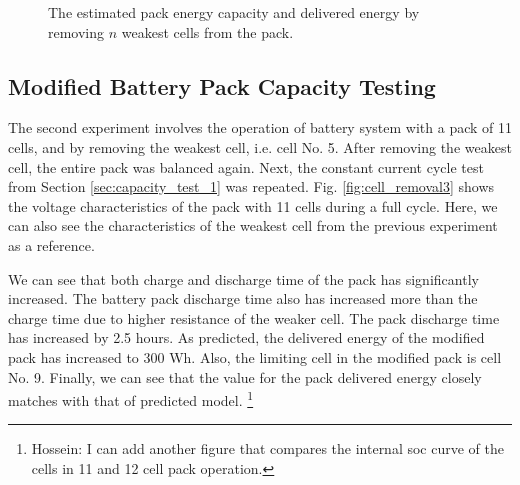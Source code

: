 \documentclass[10pt,twocolumn]{IEEEtran}
\begin{document}
  
\begin{figure}
\centering
\vspace{-0.2cm}
{} \vspace{-0.1cm}
\caption{The estimated pack energy capacity and delivered energy by removing $n$ weakest cells from the pack. }
\vspace{-0.3cm}
\label{fig:cell_removal2}
\end{figure} 


\subsection{Modified  Battery Pack Capacity Testing}
The second  experiment involves the operation of battery system with a pack of 11 cells, and by removing the weakest cell, i.e. cell No. 5. 
After removing the weakest cell, the entire pack was balanced again. Next, the constant current cycle test from Section \ref{sec:capacity_test_1}  was repeated.
Fig.  \ref{fig:cell_removal3} shows the voltage characteristics of the pack with 11 cells during a full cycle.
Here, we can also see the characteristics of the weakest cell from the previous experiment as a reference.

We can see that both charge and discharge time of the pack has significantly increased. 
The battery pack discharge time also has increased more than the charge time due to higher resistance of the weaker cell.
The pack discharge time has increased by 2.5 hours.
As predicted,  the delivered energy of the modified pack has increased to 300 Wh.
Also,  the limiting cell in the modified pack is cell No. 9. 
Finally, we can see that the value for the pack delivered energy closely matches with that of predicted model.
\footnote{Hossein: I can add another figure that compares the internal soc curve of the cells in 11 and 12 cell pack operation.}
\end{document}
